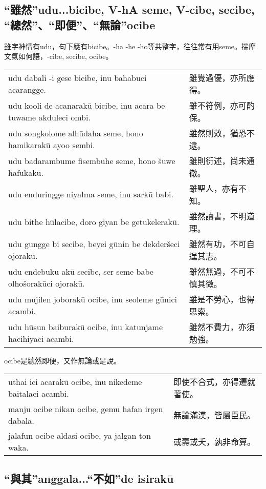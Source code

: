 \documentclass{article}
\begin{document}
\subsection{“雖然”udu...bicibe, V-hA seme, V-cibe, secibe, “總然”、“即便”、“無論”ocibe}
\noindent 雖字神情有udu，句下應有bicibe。-ha -he -ho等共整字，往往常有用seme。揣摩文氣如何語，-cibe, secibe, ocibe。
\begin{center}
    \begin{tabularx}{\textwidth}{XX}
     udu dabali -i gese bicibe, inu bahabuci acarangge. &雖覺過優，亦所應得。\\
     udu kooli de acanarak\={u} bicibe, inu acara be tuwame akduleci ombi.&雖不符例，亦可酌保。\\
     udu songkolome alh\={u}daha seme, hono hamikarak\={u} ayoo sembi.&雖然則效，猶恐不逮。\\
     udu badarambume fisembuhe seme, hono \v{s}uwe hafukak\={u}.&雖則衍述，尚未通徹。\\
     udu enduringge niyalma seme, inu sark\={u} babi.&雖聖人，亦有不知。\\
     udu bithe h\={u}lacibe, doro giyan be getukelerak\={u}.&雖然讀書，不明道理。\\
     udu gungge bi secibe, beyei g\={u}nin be dekder\v{s}eci ojorak\={u}.&雖然有功，不可自逞其志。\\
     udu endebuku ak\={u} secibe, ser seme babe olho\v{s}orak\={u}ci ojorak\={u}. &雖然無過，不可不慎其微。\\
     udu mujilen joborak\={u} ocibe, inu seoleme g\={u}nici acambi.&雖是不勞心，也得思索。\\
     udu h\={u}sun baiburak\={u} ocibe, inu katunjame hacihiyaci acambi.&雖然不費力，亦須勉強。
    \end{tabularx}
\end{center}
\noindent ocibe是總然即便，又作無論或是說。
\begin{center}
    \begin{tabularx}{\textwidth}{XX}
     uthai ici acarak\={u} ocibe, inu nikedeme baitalaci acambi.&即使不合式，亦得遷就著使。\\
     manju ocibe nikan ocibe, gemu hafan irgen dabala.&無論滿漢，皆屬臣民。\\
     jalafun ocibe aldasi ocibe, ya jalgan ton waka.&或壽或夭，孰非命算。
    \end{tabularx}
\end{center}

\subsection{“與其”anggala...“不如”de isirak\={u}}
\end{document}
